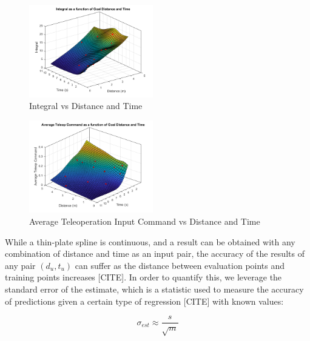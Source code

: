 \documentclass[letterpaper, 10 pt, conference]{ieeeconf}  %
\begin{document}
\begin{figure}[ht]
    \includegraphics[width=0.48\textwidth]{images/integs.png}
    \caption{Integral vs Distance and Time}
    \label{fig:integs}
\end{figure}
\begin{figure}[ht]
    \includegraphics[width=0.48\textwidth]{images/joycmds.png}
    \caption{Average Teleoperation Input Command vs Distance and Time}
    \label{fig:joys}
\end{figure}

While a thin-plate spline is continuous, and a result can be obtained with any combination of distance and time as an input pair, the accuracy of the results of any pair $(d_u,t_u)$ can suffer as the distance between evaluation points and training points increases [CITE]. In order to quantify this, we leverage the standard error of the estimate, which is a statistic used to measure the accuracy of predictions given a certain type of regression [CITE] with known values:

\begin{equation} \label{eq:stderr}
    \sigma_{est} \approx \frac{s}{\sqrt{m}}
\end{equation}
\end{document}
